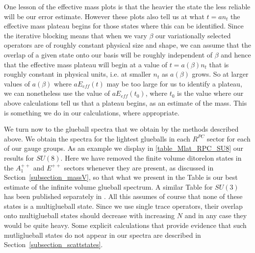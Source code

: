\documentclass[12pt]{article}
\begin{document}
One lesson of the effective mass plots is that the heavier the state
the less reliable will be our error estimate. However these plots also tell us at what
$t=an_t$ the effective mass plateau begins for those states where this can be 
identified. Since the iterative blocking means that when  we vary $\beta$ our variationally
selected operators are of roughly constant physical size and shape, we can assume
that the overlap of a given state onto our basis will be roughly independent of $\beta$
and hence that the effective mass plateau will begin at a value of $t=a(\beta)n_t$ that
is roughly constant in physical units, i.e. at smaller $n_t$ as $a(\beta)$ grows.
So at larger values of $a(\beta)$ where $aE_{eff}(t)$ may be too large for us to identify 
a plateau, we can nonetheless use the value of $aE_{eff}(t_0)$, where $t_0$ is the
value where our above calculations tell us that a plateau begins, as an estimate of the mass.
This is something we do in our calculations, where appropriate.

We turn now to the glueball spectra that we obtain by the methods described above.
We obtain the spectra for the lightest glueballs in each $R^{PC}$ sector for
each of our gauge groups. As an example we display in \ref{table_Mlat_RPC_SU8}
our results for $SU(8)$.
Here we have removed the finite volume
ditorelon states in the $A_1^{++}$ and $E^{++}$ sectors whenever they are present, 
as discussed in Section~\ref{subsection_massV}, so that what
we present in the Table is our best estimate of the infinite volume glueball spectrum.
A similar Table for $SU(3)$ has been published separately in
%
\cite{AAMT-2020}.
%
All this assumes of course that none of these states
is a multiglueball state. Since we use single trace operators, their overlap onto
multiglueball states should decrease with increasing $N$ and in any case they would be
quite heavy. Some explicit calculations that provide evidence that such mutliglueball
states do not appear in our spectra are described in Section~\ref{subsection_scattstates}.
\end{document}
